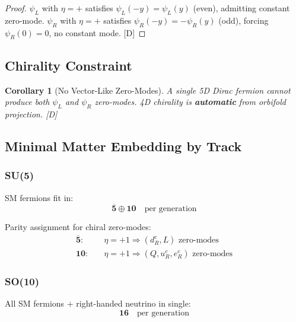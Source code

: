 \documentclass[11pt,a4paper]{article}
\newtheorem{corollary}[theorem]{Corollary}
\newcommand{\tagD}{\textcolor{blue!70!black}{[D]}}
\begin{document}
\begin{proof}
$\psi_L$ with $\eta = +$ satisfies $\psi_L(-y) = \psi_L(y)$ (even), admitting constant
zero-mode. $\psi_R$ with $\eta = +$ satisfies $\psi_R(-y) = -\psi_R(y)$ (odd),
forcing $\psi_R(0) = 0$, no constant mode. \tagD
\end{proof}

\subsection{Chirality Constraint}

\begin{corollary}[No Vector-Like Zero-Modes]
\label{cor:no-vector}
A single 5D Dirac fermion cannot produce both $\psi_L$ and $\psi_R$ zero-modes.
4D chirality is \textbf{automatic} from orbifold projection. \tagD
\end{corollary}

\subsection{Minimal Matter Embedding by Track}

\subsubsection{SU(5)}

SM fermions fit in:
\begin{equation}
\label{eq:su5-matter}
\overline{\mathbf{5}} \oplus \mathbf{10} \quad \text{per generation}
\end{equation}

Parity assignment for chiral zero-modes:
\begin{align}
\label{eq:su5-5bar}
\overline{\mathbf{5}}: \quad & \eta = +1 \Rightarrow (d_R^c, L) \text{ zero-modes} \\
\label{eq:su5-10}
\mathbf{10}: \quad & \eta = +1 \Rightarrow (Q, u_R^c, e_R^c) \text{ zero-modes}
\end{align}

\subsubsection{SO(10)}

All SM fermions + right-handed neutrino in single:
\begin{equation}
\label{eq:so10-matter}
\mathbf{16} \quad \text{per generation}
\end{equation}
\end{document}
